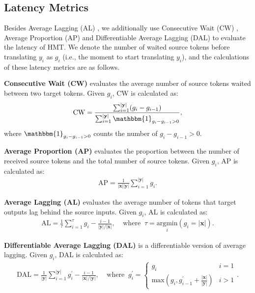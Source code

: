 \documentclass{article} %
\begin{document}
\subsection{Latency Metrics}
Besides Average Lagging (AL) \citep{ma-etal-2019-stacl}, we additionally use Consecutive Wait (CW) \citep{gu-etal-2017-learning}, Average Proportion (AP) \citep{Cho2016} and Differentiable Average Lagging (DAL) \citep{Arivazhagan2019} to evaluate the latency of HMT. We denote the number of waited source tokens before translating $y_{i}$ as $g_{i}$ (i.e., the moment to start translating $y_{i}$), and the calculations of these latency metrics are as follows.

\textbf{Consecutive Wait (CW)} \citep{gu-etal-2017-learning} evaluates the average number of source tokens waited between two target tokens. Given $g_{i}$, CW is calculated as:
\begin{gather}
    \mathrm{CW}=\frac{\sum_{i=1}^{\left | \mathbf{y} \right |} (g_{i}-g_{i-1})}{\sum_{i=1}^{\left | \mathbf{y} \right |}\mathbbm{1}_{g_{i}-g_{i-1}>0}},
\end{gather}
where $\mathbbm{1}_{g_{i}-g_{i-1}>0}$ counts the number of $g_{i}-g_{i-1}>0$.

\textbf{Average Proportion (AP)} \citep{Cho2016} evaluates the proportion between the number of received source tokens and the total number of source tokens. Given $g_{i}$, AP is calculated as:
\begin{gather}
    \mathrm{AP}=\frac{1}{\left | \mathbf{x} \right | \left | \mathbf{y} \right |}\sum_{i=1}^{\left | \mathbf{y} \right |} g_{i}.
\end{gather}

\textbf{Average Lagging (AL)} \citep{ma-etal-2019-stacl} evaluates the average number of tokens that target outputs lag behind the source inputs. Given $g_{i}$, AL is calculated as:
\begin{gather}
    \mathrm{AL}= \frac{1}{\tau }\sum_{i=1}^{\tau}g_{i}-\frac{i-1}{\left | \mathbf{y} \right |/\left | \mathbf{x} \right |},\;\;\;\; \mathrm{where} \;\;\tau = \underset{i}{\mathrm{argmin}}\left ( g_{i}= \left | \mathbf{x} \right |\right ).
\end{gather}

\textbf{Differentiable Average Lagging (DAL)} \citep{Arivazhagan2019} is a differentiable version of average lagging. Given $g_{i}$, DAL is calculated as:
\begin{gather}
\mathrm{DAL}= \frac{1}{\left | \mathbf{y} \right | }\sum\limits_{i=1}^{\left | \mathbf{y} \right |}g^{'}_{i}-\frac{i-1}{\left | \mathbf{x} \right |/\left | \mathbf{y} \right |},\;\;\;\;\mathrm{where} \;\;g^{'}_{i}= \left\{\begin{matrix}
g_{i} & i=1\\ 
 \mathrm{max}\left (g_{i},g^{'}_{i-1}+ \frac{\left | \mathbf{x} \right |}{\left | \mathbf{y} \right |} \right )& i>1
\end{matrix}\right..
\end{gather}
\end{document}
